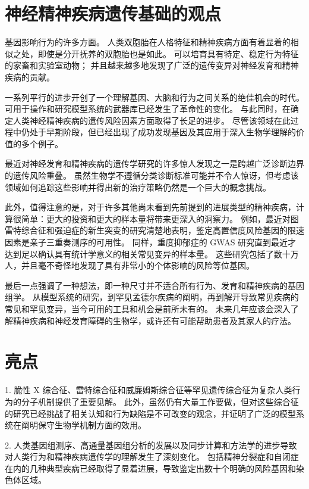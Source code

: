 \section{神经精神疾病遗传基础的观点}

基因影响行为的许多方面。 
人类双胞胎在人格特征和精神疾病方面有着显着的相似之处，即使是分开抚养的双胞胎也是如此。 
可以培育具有特定、稳定行为特征的家畜和实验室动物； 
并且越来越多地发现了广泛的遗传变异对神经发育和精神疾病的贡献。


一系列平行的进步开创了一个理解基因、大脑和行为之间关系的绝佳机会的时代。 
可用于操作和研究模型系统的武器库已经发生了革命性的变化。 
与此同时，在确定人类神经精神疾病的遗传风险因素方面取得了长足的进步。 
尽管该领域在此过程中仍处于早期阶段，但已经出现了成功发现基因及其应用于深入生物学理解的价值的多个例子。


最近对神经发育和精神疾病的遗传学研究的许多惊人发现之一是跨越广泛诊断边界的遗传风险重叠。 
虽然生物学不遵循分类诊断标准可能并不令人惊讶，但考虑该领域如何追踪这些影响并得出新的治疗策略仍然是一个巨大的概念挑战。


此外，值得注意的是，对于许多其他尚未看到先前提到的进展类型的精神疾病，计算很简单：更大的投资和更大的样本量将带来更深入的洞察力。 
例如，最近对图雷特综合征和强迫症的新生突变的研究清楚地表明，鉴定高置信度风险基因的限速因素是亲子三重奏测序的可用性。 
同样，重度抑郁症的 GWAS 研究直到最近才达到足以确认具有统计学意义的相关常见变异的样本量。 
这些研究包括了数十万人，并且毫不奇怪地发现了具有非常小的个体影响的风险等位基因。


最后一点强调了一种想法，即一种尺寸并不适合所有行为、发育和精神疾病的基因组学。 
从模型系统的研究，到罕见孟德尔疾病的阐明，再到解开导致常见疾病的常见和罕见变异，当今可用的工具和机会是前所未有的。 
未来几年应该会深入了解精神疾病和神经发育障碍的生物学，或许还有可能帮助患者及其家人的疗法。


\section{亮点}

1. 脆性 X 综合征、雷特综合征和威廉姆斯综合征等罕见遗传综合征为复杂人类行为的分子机制提供了重要见解。 
此外，虽然仍有大量工作要做，但对这些综合征的研究已经挑战了相关认知和行为缺陷是不可改变的观念，并证明了广泛的模型系统在阐明保守生物学机制方面的效用。


2. 人类基因组测序、高通量基因组分析的发展以及同步计算和方法学的进步导致对人类行为和精神疾病遗传学的理解发生了深刻变化。 
包括精神分裂症和自闭症在内的几种典型疾病已经取得了显着进展，导致鉴定出数十个明确的风险基因和染色体区域。


